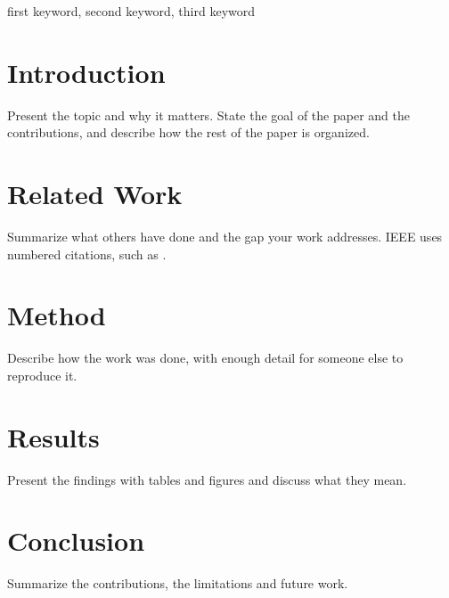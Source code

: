 \documentclass[conference]{IEEEtran}
\title{$titulo}
\author{$autor \\ Institution name \\ City, Country \\ your.email@example.com}
\begin{document}
\maketitle

\begin{abstract}
In about 150 to 250 words: the problem, what you did, how you did it and the main result.
\end{abstract}

\begin{IEEEkeywords}
first keyword, second keyword, third keyword
\end{IEEEkeywords}

\section{Introduction}

Present the topic and why it matters. State the goal of the paper and the contributions, and describe how the rest of the paper is organized.

\section{Related Work}

Summarize what others have done and the gap your work addresses. IEEE uses numbered citations, such as \cite{norman2013design}.

\section{Method}

Describe how the work was done, with enough detail for someone else to reproduce it.

\section{Results}

Present the findings with tables and figures and discuss what they mean.

\section{Conclusion}

Summarize the contributions, the limitations and future work.



\end{document}
